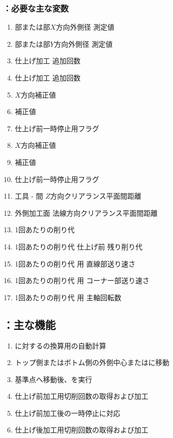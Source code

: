 \subsubsection{\KEndFaceOutCChamferRLeft：必要な主な変数}
\begin{enumerate}[label*=\sarrow]
\item \TopEndFace 部または\BottomEndFace 部$X$方向外側径 測定値
\item \TopEndFace 部または\BottomEndFace 部$Y$方向外側径 測定値
\item \TopEndFaceOutCChamfer{} 仕上げ加工 追加回数
\item \BottomEndFaceOutCChamfer{} 仕上げ加工 追加回数
\item \TopEndFaceOutCChamfer$X$方向補正値
\item \TopEndFaceOutCChamferWidth 補正値
\item \TopEndFaceOutCChamfer{} 仕上げ前一時停止用フラグ
\item \BottomEndFaceOutCChamfer$X$方向補正値
\item \BottomEndFaceOutCChamferWidth 補正値
\item \BottomEndFaceOutCChamfer{} 仕上げ前一時停止用フラグ
\item 工具 - \EndFace 間 $Z$方向クリアランス平面間距離
\item 外側加工面 法線方向クリアランス平面間距離
\item \EndFaceOutCChamferMilling1回あたりの削り代
\item \EndFaceOutCChamferMilling1回あたりの削り代{} 仕上げ前 残り削り代
\item \EndFaceOutCChamferMilling1回あたりの削り代 用 直線部送り速さ
\item \EndFaceOutCChamferMilling1回あたりの削り代 用 コーナー部送り速さ
\item \EndFaceOutCChamferMilling1回あたりの削り代 用 主軸回転数
\end{enumerate}


\subsection{\KEndFaceOutCChamferRLeft：主な機能}
\begin{enumerate}[label*=\sarrow]
\item \EndFaceOutRChamfer に対するの換算用\EndFaceOutCChamferWidth の自動計算
\item トップ側またはボトム側の\EndFace 外側中心または\OutcutMillingReferencePoint に移動
\item 基準点へ移動後、\KOLeftFS を実行
\item 仕上げ前加工用切削回数の取得および加工
\item 仕上げ前加工後の一時停止\OpauseCheck に対応
\item 仕上げ後加工用切削回数の取得および加工
\end{enumerate}


